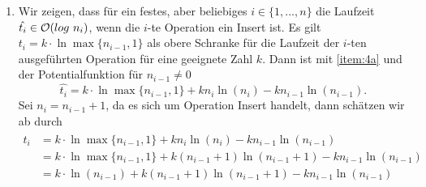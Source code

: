 \documentclass{scrartcl} %
\begin{document}
\begin{aufgabe}
\begin{enumerate}[label=(\alph*)]
\[            \]
            \begin{alignat*}{2}
                \intertext{Laut Voraussetzung gilt:}
                &&2 &\leq n\\
                \intertext{Wir nutzen einige Umformungsschritte:}
                \Longleftrightarrow&& 0 &\leq n - 2\\
                \Longleftrightarrow&& n^2 &\leq n^2 + n - 2\\
                \Longleftrightarrow&& n^2 &\leq (n + 2)(n - 1)\\
                \intertext{Da sowohl $n$ als auch $n - 1$ positiv sein müssen, können wir folgende Umformungen machen:}
                \Longleftrightarrow&& \frac{n^2}{n - 1} &\leq n + 2\\
                \Longleftrightarrow&& \frac{n}{n - 1} &\leq \frac{n + 2}{n}\\
                \Longleftrightarrow&& \frac{n}{n - 1} &\leq 1 + \frac{2}{n}
                \intertext{Dann muss laut Hinweis auch gelten:}
                &&\frac{n}{n - 1} &\leq e^{\frac{2}{n}}\\
                \Longleftrightarrow&&\hspace*{5ex}\ln\Big(\frac{n}{n - 1}\Big) &\leq \frac{2}{n}\\
                \Longleftrightarrow&&n\ln\Big(\frac{n}{n - 1}\Big) &\leq 2
            \end{alignat*}
            Gilt.
            \item \label{item:4c}Wir zeigen, dass für ein festes, aber beliebiges $i \in \{1, ..., n \}$ die Laufzeit $\hat{t_i} \in \BigO(log \ n_i)$, wenn die $i$-te Operation ein {\ttfamily Insert} ist. Es gilt $t_i = k \cdot \ln \max\{n_{i-1},1\}$ als obere Schranke für die Laufzeit der $i$-ten ausgeführten Operation für eine geeignete Zahl $k$. Dann ist mit \ref{item:4a} und der Potentialfunktion für $n_{i-1} \neq 0$ $$\hat{t_i}=k \cdot \ln \max\{n_{i-1},1\} + kn_i\ln(n_i)-kn_{i-1}\ln(n_{i-1}).$$ 
            Sei $n_i = n_{i-1}+1$, da es sich um Operation {\ttfamily Insert} handelt, dann schätzen wir ab durch 
            \begin{align*} 
            \hat{t_i} &= k \cdot \ln \max\{n_{i-1},1\} + kn_i\ln(n_i)-kn_{i-1}\ln(n_{i-1})\\ 
            &= k \cdot \ln \max\{n_{i-1},1\} + k(n_{i-1}+1)\ln(n_{i-1}+1)-kn_{i-1}\ln(n_{i-1})\\ 
            &= k \cdot \ln (n_{i-1}) + k(n_{i-1}+1)\ln(n_{i-1}+1)-kn_{i-1}\ln(n_{i-1})\\ 

\end{align*}
\end{enumerate}
\end{aufgabe}
\end{document}
